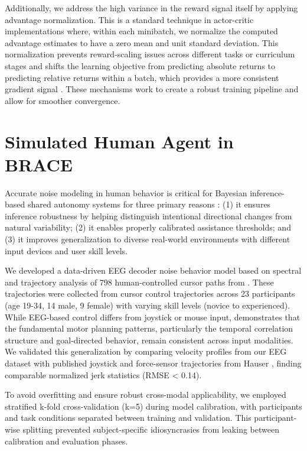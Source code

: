 \documentclass[11pt]{article}
\begin{document}
Additionally, we address the high variance in the reward signal itself by applying advantage normalization. This is a standard technique in actor-critic implementations where, within each minibatch, we normalize the computed advantage estimates to have a zero mean and unit standard deviation. This normalization prevents reward-scaling issues across different tasks or curriculum stages and shifts the learning objective from predicting absolute returns to predicting relative returns within a batch, which provides a more consistent gradient signal \cite{hu25}. These mechanisms work to create a robust training pipeline and allow for smoother convergence.

\section{Simulated Human Agent in BRACE}

Accurate noise modeling in human behavior is critical for Bayesian inference-based shared autonomy systems for three primary reasons \cite{eegrabiee}: (1) it ensures inference robustness by helping distinguish intentional directional changes from natural variability; (2) it enables properly calibrated assistance thresholds; and (3) it improves generalization to diverse real-world environments with different input devices and user skill levels.

We developed a data-driven EEG decoder noise behavior model based on spectral and trajectory analysis of 798 human-controlled cursor paths from \cite{Abiri_Cursor}. These trajectories were collected from cursor control trajectories across 23 participants (age 19-34, 14 male, 9 female) with varying skill levels (novice to experienced). While EEG-based control differs from joystick or mouse input, \cite{hernandez2024, cetera2025} demonstrates that the fundamental motor planning patterns, particularly the temporal correlation structure and goal-directed behavior, remain consistent across input modalities. We validated this generalization by comparing velocity profiles from our EEG dataset with published joystick and force-sensor trajectories from Hauser \cite{hauser}, finding comparable normalized jerk statistics (RMSE < 0.14).

To avoid overfitting and ensure robust cross-modal applicability, we employed stratified k-fold cross-validation (k=5) during model calibration, with participants and task conditions separated between training and validation. This participant-wise splitting prevented subject-specific idiosyncrasies from leaking between calibration and evaluation phases.
\end{document}
